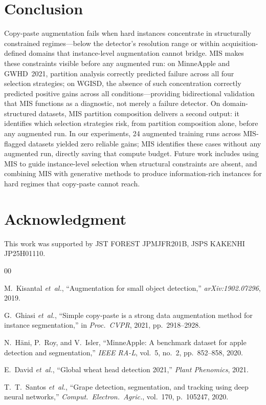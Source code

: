 \documentclass[conference]{IEEEtran}
\begin{document}
\section{Conclusion}

Copy-paste augmentation fails when hard instances concentrate
in structurally constrained regimes---below the detector's
resolution range or within acquisition-defined domains that
instance-level augmentation cannot bridge.
MIS makes these constraints visible before any augmented run:
on MinneApple and GWHD~2021, partition analysis correctly
predicted failure across all four selection strategies;
on WGISD, the absence of such concentration correctly
predicted positive gains across all conditions---providing
bidirectional validation that MIS functions as a diagnostic,
not merely a failure detector.
On domain-structured datasets, MIS partition composition
delivers a second output: it identifies which selection
strategies risk, from partition
composition alone, before any augmented run.
In our experiments, 24 augmented training runs across
MIS-flagged datasets yielded zero reliable gains; MIS
identifies these cases without any augmented run, directly
saving that compute budget.
Future work includes using MIS to guide instance-level
selection when structural constraints are absent, and
combining MIS with generative methods to produce
information-rich instances for hard regimes that
copy-paste cannot reach.

\section*{Acknowledgment}
This work was supported by JST FOREST JPMJFR201B,
JSPS KAKENHI JP25H01110.

\begin{thebibliography}{00}

M.~Kisantal \textit{et~al.},
``Augmentation for small object detection,''
\textit{arXiv:1902.07296}, 2019.

G.~Ghiasi \textit{et~al.},
``Simple copy-paste is a strong data augmentation method for
instance segmentation,''
in \textit{Proc.\ CVPR}, 2021, pp.~2918--2928.

N.~H\"{a}ni, P.~Roy, and V.~Isler,
``MinneApple: A benchmark dataset for apple detection and
segmentation,''
\textit{IEEE RA-L}, vol.~5, no.~2, pp.~852--858, 2020.

E.~David \textit{et~al.},
``Global wheat head detection 2021,''
\textit{Plant Phenomics}, 2021.

T.~T.~Santos \textit{et~al.},
``Grape detection, segmentation, and tracking using deep
neural networks,''
\textit{Comput.\ Electron.\ Agric.}, vol.~170, p.~105247, 2020.

\end{thebibliography}
\end{document}
